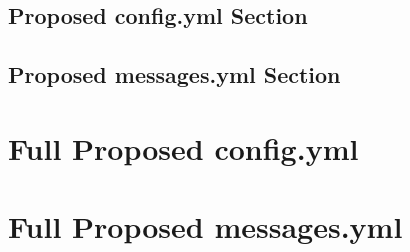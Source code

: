 \documentclass[letterpaper,12pt]{article}
\begin{document}
	\clearpage
  \subsection{Proposed config.yml Section}
  
  
  \clearpage
  \subsection{Proposed messages.yml Section}
  

  \clearpage
  \appendix
  \section{Full Proposed config.yml}
  
  
  
  

  \clearpage
  \section{Full Proposed messages.yml}
  
  
\end{document}
